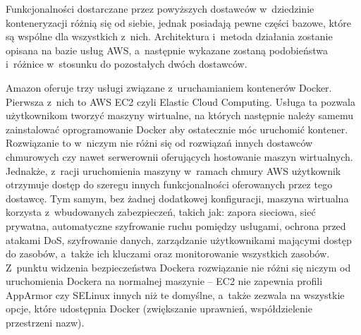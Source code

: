Funkcjonalności dostarczane przez powyższych dostawców w~dziedzinie konteneryzacji różnią się od siebie, jednak posiadają pewne części bazowe, które są wspólne dla wszystkich z~nich. Architektura i~metoda działania zostanie opisana na bazie usług AWS, a~następnie wykazane zostaną podobieństwa i~różnice w~stosunku do pozostałych dwóch dostawców.

\begin{table}[ht]
    \centering
    \caption{Podobieństwa w~usługach oferowanych przez dostawców chmurowych}
    \label{table:cloudNames}
\end{table}

Amazon oferuje trzy usługi związane z~uruchamianiem kontenerów Docker. Pierwsza z~nich to AWS EC2 czyli Elastic Cloud Computing. Usługa ta pozwala użytkownikom tworzyć maszyny wirtualne, na których następnie należy samemu zainstalować oprogramowanie Docker aby ostatecznie móc uruchomić kontener. Rozwiązanie to w~niczym nie różni się od rozwiązań innych dostawców chmurowych czy nawet serwerownii oferujących hostowanie maszyn wirtualnych. Jednakże, z~racji uruchomienia maszyny w~ramach chmury AWS użytkownik otrzymuje dostęp do szeregu innych funkcjonalności oferowanych przez tego dostawcę. Tym samym, bez żadnej dodatkowej konfiguracji, maszyna wirtualna korzysta z~wbudowanych zabezpieczeń, takich jak: zapora sieciowa, sieć prywatna, automatyczne szyfrowanie ruchu pomiędzy usługami, ochrona przed atakami DoS, szyfrowanie danych, zarządzanie użytkownikami mającymi dostęp do zasobów, a~także ich kluczami oraz monitorowanie wszystkich zasobów. Z~punktu widzenia bezpieczeństwa Dockera rozwiązanie nie różni się niczym od uruchomienia Dockera na normalnej maszynie -- EC2 nie zapewnia profili AppArmor czy SELinux innych niż te domyślne, a~także zezwala na wszystkie opcje, które udostępnia Docker (zwiększanie uprawnień, współdzielenie przestrzeni nazw).

